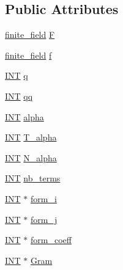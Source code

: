 \subsection*{Public Attributes}
\begin{DoxyCompactItemize}
\item 
\mbox{\hyperlink{classfinite__field}{finite\+\_\+field}} \mbox{\hyperlink{classunusual__model_ac224d047c4c0b2c9fed96d9a451038e3}{F}}
\item 
\mbox{\hyperlink{classfinite__field}{finite\+\_\+field}} \mbox{\hyperlink{classunusual__model_a76ec597ec61c375d8c00c9cd85fa1d30}{f}}
\item 
\mbox{\hyperlink{galois_8h_a09fddde158a3a20bd2dcadb609de11dc}{I\+NT}} \mbox{\hyperlink{classunusual__model_af800c771403b11e428bc8f7e6f1e5149}{q}}
\item 
\mbox{\hyperlink{galois_8h_a09fddde158a3a20bd2dcadb609de11dc}{I\+NT}} \mbox{\hyperlink{classunusual__model_ab73c14bac532d4e215b7f235ca66fda8}{qq}}
\item 
\mbox{\hyperlink{galois_8h_a09fddde158a3a20bd2dcadb609de11dc}{I\+NT}} \mbox{\hyperlink{classunusual__model_a3b89f5dc902cb59d4e0b1d0c5def9e7e}{alpha}}
\item 
\mbox{\hyperlink{galois_8h_a09fddde158a3a20bd2dcadb609de11dc}{I\+NT}} \mbox{\hyperlink{classunusual__model_a70d74cbb2645b3d70aabae2c8996e79e}{T\+\_\+alpha}}
\item 
\mbox{\hyperlink{galois_8h_a09fddde158a3a20bd2dcadb609de11dc}{I\+NT}} \mbox{\hyperlink{classunusual__model_a5920a4d931cce472d402e4b635fbe4d4}{N\+\_\+alpha}}
\item 
\mbox{\hyperlink{galois_8h_a09fddde158a3a20bd2dcadb609de11dc}{I\+NT}} \mbox{\hyperlink{classunusual__model_ac9bba3cb424730c5ea75792ac4ff59d1}{nb\+\_\+terms}}
\item 
\mbox{\hyperlink{galois_8h_a09fddde158a3a20bd2dcadb609de11dc}{I\+NT}} $\ast$ \mbox{\hyperlink{classunusual__model_a6176cab79577cc28322ab56e4baad64a}{form\+\_\+i}}
\item 
\mbox{\hyperlink{galois_8h_a09fddde158a3a20bd2dcadb609de11dc}{I\+NT}} $\ast$ \mbox{\hyperlink{classunusual__model_aae552f9faea0ef243251e5d24979ad2c}{form\+\_\+j}}
\item 
\mbox{\hyperlink{galois_8h_a09fddde158a3a20bd2dcadb609de11dc}{I\+NT}} $\ast$ \mbox{\hyperlink{classunusual__model_ab83fd5d4cefb87f467e4d98a1609de5d}{form\+\_\+coeff}}
\item 
\mbox{\hyperlink{galois_8h_a09fddde158a3a20bd2dcadb609de11dc}{I\+NT}} $\ast$ \mbox{\hyperlink{classunusual__model_a1d78fcee11a9655c006d91121ef2ac9b}{Gram}}

\end{DoxyCompactItemize}

